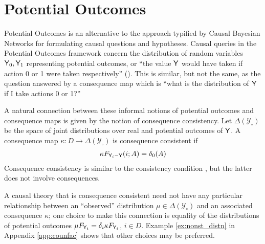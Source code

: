 
\section{Potential Outcomes}

Potential Outcomes is an alternative to the approach typified by Causal Bayesian Networks for formulating causal questions and hypotheses. Causal queries in the Potential Outcomes framework concern the distribution of random variables $\mathsf{Y}_0, \mathsf{Y}_1$ representing potential outcomes, or ``the value $\mathsf{Y}$ would have taken if action 0 or 1 were taken respectively'' (\cite{angrist_mastering_2014}). This is similar, but not the same, as the question answered by a consequence map which is ``what is the distribution of $\mathsf{Y}$ if I take actions 0 or 1?''

A natural connection between these informal notions of potential outcomes and consequence maps is given by the notion of consequence consistency. Let $\Delta(\mathcal{Y}_\circ)$ be the space of joint distributions over real and potential outcomes of $\mathsf{Y}$. A consequence map $\kappa:D\to \Delta(\mathcal{Y}_\circ)$ is consequence consistent if
\begin{align}
    \kappa F_{\mathsf{Y}_i-\mathsf{Y}} (i;A)=\delta_0(A) \label{eq:oc_consist}
\end{align} 
Consequence consistency is similar to the consistency condition \citep{richardson2013single}, but the latter does not involve consequences.

A causal theory that is consequence consistent need not have any particular relationship between an ``observed'' distribution $\mu\in \Delta(\mathcal{Y}_\circ)$ and an associated consequence $\kappa$; one choice to make this connection is equality of the distributions of potential outcomes $\mu F_{\mathsf{Y}_i} = \delta_i \kappa F_{\mathsf{Y}_i}$, $i\in D$. Example \ref{ex:nonst_distn} in Appendix \ref{app:counfac} shows that other choices may be preferred.


